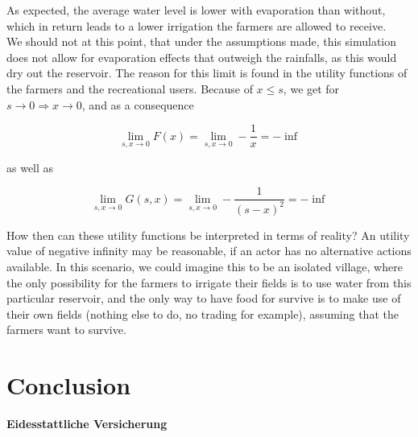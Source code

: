 \documentclass[12pt, a4paper, oneside]{article}
\begin{document}
As expected, the average water level is lower with evaporation than without, which in return leads to a lower irrigation the farmers are allowed to receive. \\
We should not at this point, that under the assumptions made, this simulation does not allow for evaporation effects that outweigh the rainfalls, as this would dry out the reservoir. The reason for this limit is found in the utility functions of the farmers and the recreational users. Because of $x\leq s$, we get for $s\to 0 \Rightarrow x\to 0$, and as a consequence 

\begin{equation}
\lim_{s, x\to0}F(x) = \lim_{s,x\to0}-\frac{1}{x} = -\inf
\end{equation}

as well as

\begin{equation}
\lim_{s, x\to0}G(s,x) = \lim_{s,x\to0}-\frac{1}{(s-x)^2} = -\inf
\end{equation}

How then can these utility functions be interpreted in terms of reality? 
An utility value of negative infinity may be reasonable, if an actor has no alternative actions available. 
In this scenario, we could imagine this to be an isolated village, where the only possibility for the farmers to irrigate their fields is to use water from this particular reservoir, and the only way to have food for survive is to make use of their own fields (nothing else to do, no trading for example), assuming that the farmers want to survive. 

\section{Conclusion}
\clearpage
\printbibliography

\newpage






\pagestyle{empty} 
\begingroup
\begin{center}
	\large
	\textbf{Eidesstattliche Versicherung}
\end{center}

\vspace{0.3cm}
\end{document}
